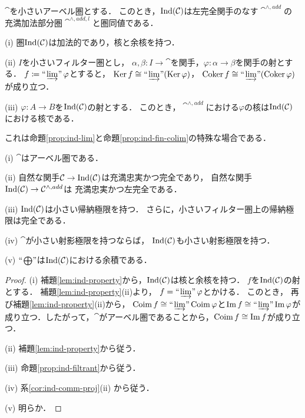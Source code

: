 \begin{Corollary}
    $\cat$を小さいアーベル圏とする．
    このとき，$\Ind(\cat)$は左完全関手のなす$\cat^{\wedge,add}$の
    充満加法部分圏$\cat^{\wedge,add,l}$と圏同値である．
\end{Corollary}

\begin{Lemma}\label{lem:ind-property}
    (i) 
    圏$\Ind(\cat)$は加法的であり，核と余核を持つ．

    (ii) 
    $I$を小さいフィルター圏とし，
    $\alpha, \beta\colon I\to\cat$を関手，$\varphi\colon\alpha\to\beta$を関手の射とする．
    $f\coloneqq\limf\varphi$とすると，
    $\Ker f\cong\limf(\Ker\varphi)$，
    $\Coker f\cong\limf(\Coker\varphi)$が成り立つ．

    (iii) 
    $\varphi\colon A\to B$を$\Ind(\cat)$の射とする．
    このとき，$\cat^{\wedge,add}$における$\varphi$の核は$\Ind(\cat)$における核である．
\end{Lemma}

これは命題\ref{prop:ind-lim}と命題\ref{prop:ind-fin-colim}の特殊な場合である．

\begin{Theorem}
    (i) 
    $\cat$はアーベル圏である．

    (ii) 
    自然な関手$\cat\to\Ind(\cat)$は充満忠実かつ完全であり，
    自然な関手$\Ind(\cat)\to\cat^{\wedge,add}$は
    充満忠実かつ左完全である．

    (iii) 
    $\Ind(\cat)$は小さい帰納極限を持つ．
    さらに，小さいフィルター圏上の帰納極限は完全である．

    (iv) 
    $\cat$が小さい射影極限を持つならば，
    $\Ind(\cat)$も小さい射影極限を持つ．

    (v) 
    $\ind<\bigoplus>$は$\Ind(\cat)$における余積である．
\end{Theorem}

\begin{proof}
    (i) 
    補題\ref{lem:ind-property}から，$\Ind(\cat)$は核と余核を持つ．
    $f$を$\Ind(\cat)$の射とする．
    補題\ref{lem:ind-property}(ii)より，
    $f=\limf\varphi$とかける．
    このとき，
    再び補題\ref{lem:ind-property}(ii)から，
    $\Coim f\cong\limf\Coim\varphi$と$\im f\cong\limf\im\varphi$が
    成り立つ．したがって，$\cat$がアーベル圏であることから，$\Coim f\cong\im f$が成り立つ．

    (ii) 
    補題\ref{lem:ind-property}から従う．

    (iii) 
    命題\ref{prop:ind-filtrant}から従う．

    (iv) 
    系\ref{cor:ind-comm-proj}(ii) から従う．

    (v) 
    明らか．
\end{proof}


